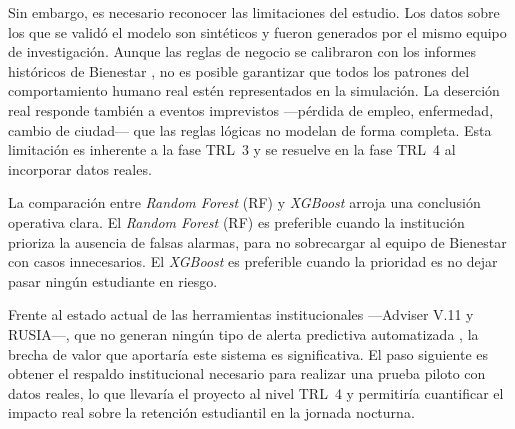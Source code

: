 \documentclass[12pt,letterpaper]{article}
\newcommand{\RF}{\textit{Random Forest} (RF)\xspace}
\newcommand{\XGB}{\textit{XGBoost}\xspace}
\begin{document}
Sin embargo, es necesario reconocer las limitaciones del estudio. Los datos sobre los que se validó el modelo son sintéticos y fueron generados por el mismo equipo de investigación. Aunque las reglas de negocio se calibraron con los informes históricos de Bienestar \parencite{etitc_bienestar}, no es posible garantizar que todos los patrones del comportamiento humano real estén representados en la simulación. La deserción real responde también a eventos imprevistos —pérdida de empleo, enfermedad, cambio de ciudad— que las reglas lógicas no modelan de forma completa. Esta limitación es inherente a la fase TRL~3 y se resuelve en la fase TRL~4 al incorporar datos reales.

La comparación entre \RF y \XGB arroja una conclusión operativa clara. El \RF es preferible cuando la institución prioriza la ausencia de falsas alarmas, para no sobrecargar al equipo de Bienestar con casos innecesarios. El \XGB es preferible cuando la prioridad es no dejar pasar ningún estudiante en riesgo.

Frente al estado actual de las herramientas institucionales —Adviser V.11 y RUSIA—, que no generan ningún tipo de alerta predictiva automatizada \parencite{bersoft2024}, la brecha de valor que aportaría este sistema es significativa. El paso siguiente es obtener el respaldo institucional necesario para realizar una prueba piloto con datos reales, lo que llevaría el proyecto al nivel TRL~4 y permitiría cuantificar el impacto real sobre la retención estudiantil en la jornada nocturna.

\newpage
\printbibliography[title={Referencias bibliográficas}]
\end{document}
